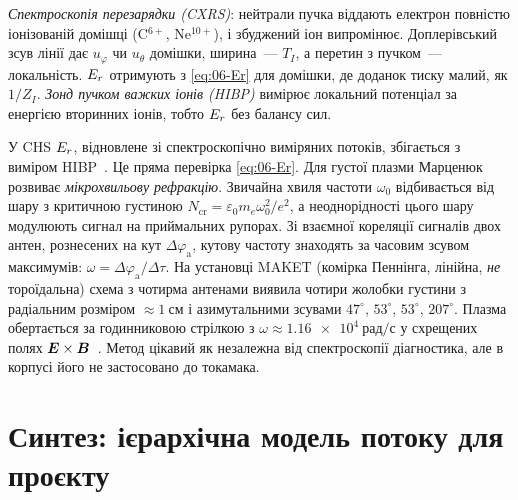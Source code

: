 \begin{outofcorpus}
\emph{Спектроскопія перезарядки (CXRS)}: нейтрали пучка віддають електрон повністю іонізованій домішці (C$^{6+}$, Ne$^{10+}$), і збуджений іон випромінює. Доплерівський зсув лінії дає $u_\varphi$ чи $u_\theta$ домішки, ширина~--- $T_I$, а перетин з пучком~--- локальність. $E_{r}$ отримують з \eqref{eq:06-Er} для домішки, де доданок тиску малий, як $1/Z_I$. \emph{Зонд пучком важких іонів (HIBP)} вимірює локальний потенціал за енергією вторинних іонів, тобто $E_{r}$ без балансу сил.
\end{outofcorpus}

У CHS $E_{r}$, відновлене зі спектроскопічно виміряних потоків, збігається з виміром HIBP~\cite{Ida2001}. Це пряма перевірка \eqref{eq:06-Er}. Для густої плазми Марценюк~\cite[с.~119--126]{Martsenyuk2025} розвиває \emph{мікрохвильову рефракцію}. Звичайна хвиля частоти $\omega_0$ відбивається від шару з критичною густиною $N_{\mathrm{cr}}=\varepsilon_0m_e\omega_0^2/e^2$, а неоднорідності цього шару модулюють сигнал на приймальних рупорах. Зі взаємної кореляції сигналів двох антен, рознесених на кут $\Delta\varphi_{\mathrm a}$, кутову частоту знаходять за часовим зсувом максимумів: $\omega=\Delta\varphi_{\mathrm a}/\Delta\tau$. На установці MAKET (комірка Пеннінга, лінійна, \emph{не} тороїдальна) схема з чотирма антенами виявила чотири жолобки густини з радіальним розміром $\approx\SI{1}{см}$ і азимутальними зсувами $47^\circ$, $53^\circ$, $53^\circ$, $207^\circ$. Плазма обертається за годинниковою стрілкою з $\omega\approx\SI{1,16e4}{рад/с}$ у схрещених полях $\bm{E}\times\bm{B}$~\cite{Martsenyuk2025}. Метод цікавий як незалежна від спектроскопії діагностика, але в корпусі його не застосовано до токамака.

\section{Синтез: ієрархічна модель потоку для проєкту}\label{sec:06-model}

